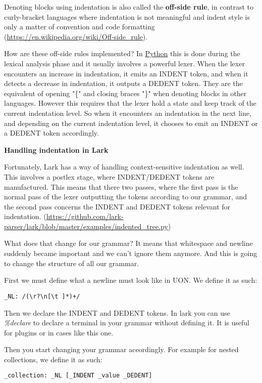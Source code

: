 \documentclass[12pt]{article}
\begin{document}
Denoting blocks using indentation is also called the \textbf{off-side rule}, in contrast to curly-bracket languages where indentation is not meaningful and indent style is only a matter of convention and code formatting (\url{https://en.wikipedia.org/wiki/Off-side_rule}).

How are these off-side rules implemented? In \href{https://docs.python.org/3/reference/lexical_analysis.html#indentation}{Python} this is done during the lexical analysis phase and it usually involves a powerful lexer. When the lexer encounters an increase in indentation, it emits an INDENT token, and when it detects a decrease in indentation, it outputs a DEDENT token. They are the equivalent of opening "\{" and closing braces "\}" when denoting blocks in other languages. However this requires that the lexer hold a state and keep track of the current indentation level. So when it encounters an indentation in the next line, and depending on the current indentation level, it chooses to emit an INDENT or a DEDENT token accordingly. 

\textbf{Handling indentation in Lark}

Fortunately, Lark has a way of handling context-sensitive indentation as well. This involves a postlex stage, where INDENT/DEDENT tokens are manufactured. This means that there two passes, where the first pass is the normal pass of the lexer outputting the tokens according to our grammar, and the second pass concerns the INDENT and DEDENT tokens relevant for indentation. (\url{https://github.com/lark-parser/lark/blob/master/examples/indented_tree.py})

What does that change for our grammar? It means that whitespace and newline suddenly became important and we can't ignore them anymore. And this is going to change the structure of all our grammar.

First we must define what a newline must look like in UON. We define it as such:
\begin{lstlisting}
_NL: /(\r?\n[\t ]*)+/
\end{lstlisting}

Then we declare the INDENT and DEDENT tokens. In lark you can use \emph{\%declare} to declare a terminal in your grammar without defining it. It is useful for plugins or in cases like this one.  

Then you start changing your grammar accordingly. For example for nested collections, we define it as such:

\begin{lstlisting}
_collection: _NL [_INDENT _value _DEDENT]
\end{lstlisting}
\end{document}
